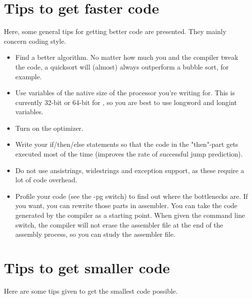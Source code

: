 \section{Tips to get faster code}
Here, some general tips for getting better code are presented. They
mainly concern coding style.

\begin{itemize}
\item Find a better algorithm. No matter how much you and the compiler
tweak the code, a quicksort will (almost) always outperform a bubble
sort, for example.

\item Use variables of the native size of the processor you're writing
for. This is currently 32-bit or 64-bit for \fpc, so you are best to
use longword and longint variables.

\item Turn on the optimizer.

\item Write your if/then/else statements so that the code in the "then"-part
gets executed most of the time (improves the rate of successful jump prediction).

\item Do not use ansistrings, widestrings and exception support, as these 
require a lot of code overhead.

\item Profile your code (see the -pg switch) to find out where the
bottlenecks are. If you want, you can rewrite those parts in assembler.
You can take the code generated by the compiler as a starting point. When
given the  command line switch, the compiler will not erase the
assembler file at the end of the assembly process, so you can study the
assembler file.

\end{itemize}

\section{Tips to get smaller code}
Here are some tips given to get the smallest code possible.


